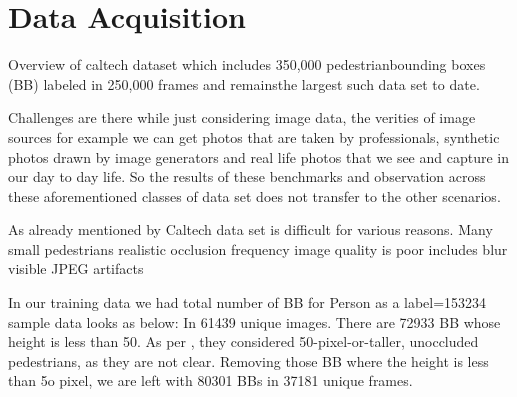 %


\section{Data Acquisition}

Overview of caltech dataset
 \cite{dollar2011pedestrian}
which  includes   350,000  pedestrianbounding boxes (BB) labeled in 250,000 frames and remainsthe largest  such data  set to  date.

Challenges are there while just considering image data, 
the verities of image sources for example we can get photos that are taken by 
professionals, synthetic photos drawn by image generators and real life photos 
that we see and capture in our day to day life. So the results of these benchmarks and 
observation across these aforementioned classes of data set does not transfer to the other scenarios.

As already mentioned by \cite{walk2010new} Caltech data set is difficult for various reasons.
Many small pedestrians
realistic occlusion frequency
image quality is poor
includes blur
visible JPEG artifacts

\newpara
In our training data we had total number of BB for Person as a label=153234
sample data looks as below:
In 61439 unique images.
There are 72933 BB whose height is less than 50. As per \cite{walk2010new}, they considered 50-pixel-or-taller, unoccluded pedestrians, as they are not clear. Removing those BB where the height is less than 5o pixel, we are left with 80301 BBs in 37181 unique frames.

